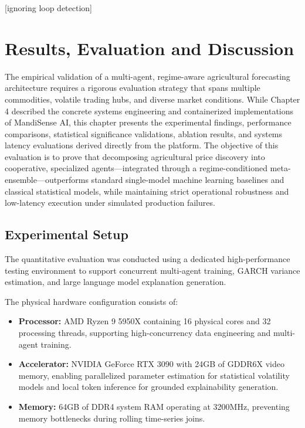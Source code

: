 \documentclass[12pt,a4paper]{report}
\theoremstyle{definition}
\theoremstyle{remark}
\begin{document}

[ignoring loop detection]

\chapter{Results, Evaluation and Discussion}

The empirical validation of a multi-agent, regime-aware agricultural forecasting architecture requires a rigorous evaluation strategy that spans multiple commodities, volatile trading hubs, and diverse market conditions. While Chapter 4 described the concrete systems engineering and containerized implementations of MandiSense AI, this chapter presents the experimental findings, performance comparisons, statistical significance validations, ablation results, and systems latency evaluations derived directly from the platform. The objective of this evaluation is to prove that decomposing agricultural price discovery into cooperative, specialized agents—integrated through a regime-conditioned meta-ensemble—outperforms standard single-model machine learning baselines and classical statistical models, while maintaining strict operational robustness and low-latency execution under simulated production failures.

\section{Experimental Setup}

The quantitative evaluation was conducted using a dedicated high-performance testing environment to support concurrent multi-agent training, GARCH variance estimation, and large language model explanation generation. 

The physical hardware configuration consists of:
\begin{itemize}
    \item \textbf{Processor:} AMD Ryzen 9 5950X containing 16 physical cores and 32 processing threads, supporting high-concurrency data engineering and multi-agent training.
    \item \textbf{Accelerator:} NVIDIA GeForce RTX 3090 with 24GB of GDDR6X video memory, enabling parallelized parameter estimation for statistical volatility models and local token inference for grounded explainability generation.
    \item \textbf{Memory:} 64GB of DDR4 system RAM operating at 3200MHz, preventing memory bottlenecks during rolling time-series joins.
\end{itemize}
\end{document}
